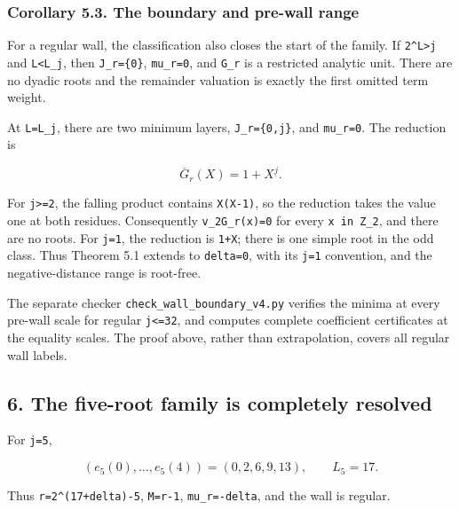 \documentclass[11pt,letterpaper]{article}
\begin{document}
\subsubsection{Corollary 5.3. The boundary and pre-wall range}\label{corollary-5.3.-the-boundary-and-pre-wall-range}

For a regular wall, the classification also closes the start of the family. If \texttt{2\^{}L\textgreater{}j} and \texttt{L\textless{}L\_j}, then \texttt{J\_r=\{0\}}, \texttt{mu\_r=0}, and \texttt{G\_r} is a restricted analytic unit. There are no dyadic roots and the remainder valuation is exactly the first omitted term weight.

At \texttt{L=L\_j}, there are two minimum layers, \texttt{J\_r=\{0,j\}}, and \texttt{mu\_r=0}. The reduction is

\[
\overline G_r(X)=1+X^{\underline j}.
\]

For \texttt{j\textgreater{}=2}, the falling product contains \texttt{X(X-1)}, so the reduction takes the value one at both residues. Consequently \texttt{v\_2G\_r(x)=0} for every \texttt{x\ in\ Z\_2}, and there are no roots. For \texttt{j=1}, the reduction is \texttt{1+X}; there is one simple root in the odd class. Thus Theorem 5.1 extends to \texttt{delta=0}, with its \texttt{j=1} convention, and the negative-distance range is root-free.

The separate checker \texttt{check\_wall\_boundary\_v4.py} verifies the minima at every pre-wall scale for regular \texttt{j\textless{}=32}, and computes complete coefficient certificates at the equality scales. The proof above, rather than extrapolation, covers all regular wall labels.

\subsection{6. The five-root family is completely resolved}\label{the-five-root-family-is-completely-resolved}

For \texttt{j=5},

\[
(e_5(0),\ldots,e_5(4))=(0,2,6,9,13),\qquad L_5=17.
\]

Thus \texttt{r=2\^{}(17+delta)-5}, \texttt{M=r-1}, \texttt{mu\_r=-delta}, and the wall is regular.
\end{document}
